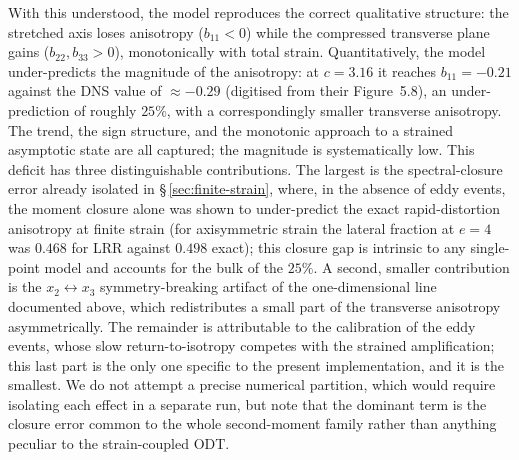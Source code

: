 \documentclass[lineno]{JFM-FLM_Au}
\begin{document}
With this understood, the model reproduces the correct qualitative structure: the
stretched axis loses anisotropy ($b_{11}<0$) while the compressed transverse
plane gains ($b_{22},b_{33}>0$), monotonically with total strain. Quantitatively,
the model under-predicts the magnitude of the anisotropy: at $c=3.16$ it reaches
$b_{11}=-0.21$ against the DNS value of $\approx-0.29$ (digitised from their
Figure~5.8), an under-prediction of roughly $25\%$, with a correspondingly
smaller transverse anisotropy. The trend, the sign structure, and the monotonic
approach to a strained asymptotic state are all captured; the magnitude is
systematically low. This deficit has three distinguishable contributions. The
largest is the spectral-closure error already isolated in
\S\,\ref{sec:finite-strain}, where, in the absence of eddy events, the moment
closure alone was shown to under-predict the exact rapid-distortion anisotropy at
finite strain (for axisymmetric strain the lateral fraction at $e=4$ was $0.468$
for LRR against $0.498$ exact); this closure gap is intrinsic to any single-point
model and accounts for the bulk of the $25\%$. A second, smaller contribution is
the $x_2\leftrightarrow x_3$ symmetry-breaking artifact of the one-dimensional
line documented above, which redistributes a small part of the transverse
anisotropy asymmetrically. The remainder is attributable to the calibration of
the eddy events, whose slow return-to-isotropy competes with the strained
amplification; this last part is the only one specific to the present
implementation, and it is the smallest. We do not attempt a precise numerical
partition, which would require isolating each effect in a separate run, but note
that the dominant term is the closure error common to the whole second-moment
family rather than anything peculiar to the strain-coupled ODT.
\end{document}
